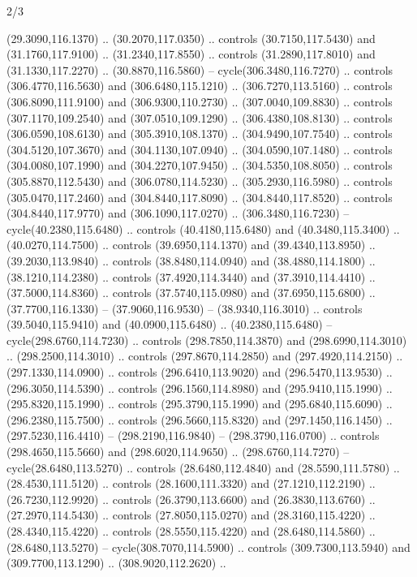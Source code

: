 \begin{flagdescription}{2/3}
\begin{scope}[xshift=0.5\flaglength,yshift=0.5\flagwidth,scale=\stretchfactor]
\begin{scope}[scale=0.001645\flagwidth,yshift=65mm,xshift=-63mm]
\begin{scope}[y=0.80pt, x=0.80pt, yscale=-1,]
\begin{scope}[cm={{1.33333,0.0,0.0,1.33333,(0.0,1e-05)}}]
  (29.3090,116.1370) .. (30.2070,117.0350) .. controls (30.7150,117.5430) and
  (31.1760,117.9100) .. (31.2340,117.8550) .. controls (31.2890,117.8010) and
  (31.1330,117.2270) .. (30.8870,116.5860) -- cycle(306.3480,116.7270) ..
  controls (306.4770,116.5630) and (306.6480,115.1210) .. (306.7270,113.5160) ..
  controls (306.8090,111.9100) and (306.9300,110.2730) .. (307.0040,109.8830) ..
  controls (307.1170,109.2540) and (307.0510,109.1290) .. (306.4380,108.8130) ..
  controls (306.0590,108.6130) and (305.3910,108.1370) .. (304.9490,107.7540) ..
  controls (304.5120,107.3670) and (304.1130,107.0940) .. (304.0590,107.1480) ..
  controls (304.0080,107.1990) and (304.2270,107.9450) .. (304.5350,108.8050) ..
  controls (305.8870,112.5430) and (306.0780,114.5230) .. (305.2930,116.5980) ..
  controls (305.0470,117.2460) and (304.8440,117.8090) .. (304.8440,117.8520) ..
  controls (304.8440,117.9770) and (306.1090,117.0270) .. (306.3480,116.7230) --
  cycle(40.2380,115.6480) .. controls (40.4180,115.6480) and (40.3480,115.3400)
  .. (40.0270,114.7500) .. controls (39.6950,114.1370) and (39.4340,113.8950) ..
  (39.2030,113.9840) .. controls (38.8480,114.0940) and (38.4880,114.1800) ..
  (38.1210,114.2380) .. controls (37.4920,114.3440) and (37.3910,114.4410) ..
  (37.5000,114.8360) .. controls (37.5740,115.0980) and (37.6950,115.6800) ..
  (37.7700,116.1330) -- (37.9060,116.9530) -- (38.9340,116.3010) .. controls
  (39.5040,115.9410) and (40.0900,115.6480) .. (40.2380,115.6480) --
  cycle(298.6760,114.7230) .. controls (298.7850,114.3870) and
  (298.6990,114.3010) .. (298.2500,114.3010) .. controls (297.8670,114.2850) and
  (297.4920,114.2150) .. (297.1330,114.0900) .. controls (296.6410,113.9020) and
  (296.5470,113.9530) .. (296.3050,114.5390) .. controls (296.1560,114.8980) and
  (295.9410,115.1990) .. (295.8320,115.1990) .. controls (295.3790,115.1990) and
  (295.6840,115.6090) .. (296.2380,115.7500) .. controls (296.5660,115.8320) and
  (297.1450,116.1450) .. (297.5230,116.4410) -- (298.2190,116.9840) --
  (298.3790,116.0700) .. controls (298.4650,115.5660) and (298.6020,114.9650) ..
  (298.6760,114.7270) -- cycle(28.6480,113.5270) .. controls (28.6480,112.4840)
  and (28.5590,111.5780) .. (28.4530,111.5120) .. controls (28.1600,111.3320)
  and (27.1210,112.2190) .. (26.7230,112.9920) .. controls (26.3790,113.6600)
  and (26.3830,113.6760) .. (27.2970,114.5430) .. controls (27.8050,115.0270)
  and (28.3160,115.4220) .. (28.4340,115.4220) .. controls (28.5550,115.4220)
  and (28.6480,114.5860) .. (28.6480,113.5270) -- cycle(308.7070,114.5900) ..
  controls (309.7300,113.5940) and (309.7700,113.1290) .. (308.9020,112.2620) ..

\end{scope}
\end{scope}
\end{scope}
\end{scope}
\end{flagdescription}
